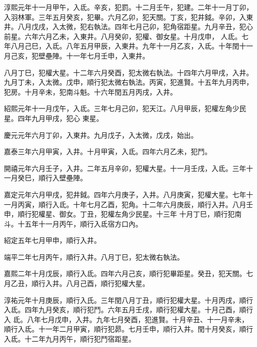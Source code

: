 \begin{pinyinscope}
 淳熙元年十一月甲午，入氐。辛亥，犯罰。十二月壬午，犯建。二年十一月丁卯，入羽林軍。三年五月癸亥，犯畢。六月乙卯，犯天關。丁亥，犯井鉞。辛卯，入東井。八月戊戌，入太微，犯右執法。四年七月己卯，犯角宿距星。九月辛丑，犯心前星。六年六月乙未，入東井。八月癸卯，犯權、御女星。十月戊申，
 人氐。七年八月己巳，入氐。八年五月甲辰，入東井。九年十一月乙亥，入氐。十年閏十一月己亥，犯壁壘陣。十一年七月壬申，入東井。



 八月丁巳，犯權大星。十二年六月癸酉，犯太微右執法。十四年六月甲戌，入井。九月丁未，入太微。戊申，順行犯太微右執法。丙寅，犯進賢。十五年九月丙申，犯房。十月辛未，犯南斗魁。十六年閏五月丙戌，入井。



 紹熙元年十一月戊午，入氐。三年七月己卯，犯天江。八月甲辰，犯權左角少民星。四年九月甲戌，犯心
 東星。



 慶元元年六月丁卯，入東井。九月戊子，入太微，戊戌，始出。



 嘉泰三年六月甲寅，入井。十月甲寅，入氐。四年六月乙未，犯鬥。



 開禧元年六月壬子，入井。二年五月辛卯，犯權大星。十一月壬戌，入氐。三年十一月癸巳，順行入壁壘陣。



 嘉定元年六月甲戌，犯井鉞。四年六月庚子，入井。八月庚寅，犯權大星。七年十一月丙寅，順行入氐。十年七月乙酉，犯角。十二年六月庚辰，順行入井。八月壬申，順行犯權星、御女。丁丑，犯權左角少民星。十三年
 十月丁巳，順行犯南斗。十五年十一月丙午，順行入氐宿方口內。



 紹定五年七月甲申，順行入井。



 端平二年七月丙午，順行入井。八月丁巳，犯太微右執法。



 嘉熙二年十月戊辰，順行入氐。四年六月己亥，順行犯畢距星。癸丑，犯天關。七月乙丑，順行入井。八月己酉，順行犯權大星。



 淳祐元年十月庚辰，順行入氏。三年閏八月丁丑，順行犯權大星。十月丙戌，順行入氐。四年九月癸亥，順行犯鬥。六年五月壬戌，順行犯權大星。十月己酉，順行入
 氐。八年七月戊申，入井。九年七月癸酉，犯進賢。十月辛丑、十一月辛未，順行入氐。十一年二月甲寅，順行犯昴。七月壬申，順行入井。閏十月癸亥，順行入氐。十二年九月丙午，順行犯鬥宿距星。




\end{pinyinscope}
